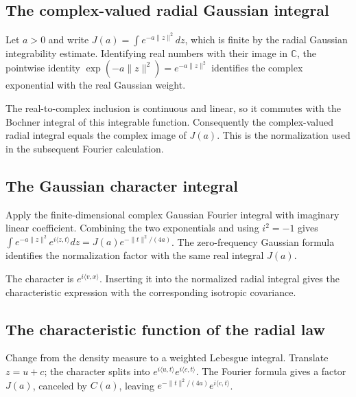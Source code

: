 \documentclass[11pt,a4paper]{report}
\begin{document}
\subsection{\texorpdfstring{The complex-valued radial Gaussian integral}{The complex-valued radial Gaussian integral}}
\label{report-step-UnadjustedLangevin-GaussianProposalDensity-lean-9}


Let \(a>0\) and write \(J(a)=\int e^{-a\|z\|^2}dz\), which is finite by the radial Gaussian integrability estimate. Identifying real numbers with their image in \(\mathbb C\), the pointwise identity \(\exp(-a\|z\|^2)=e^{-a\|z\|^2}\) identifies the complex exponential with the real Gaussian weight.



The real-to-complex inclusion is continuous and linear, so it commutes with the Bochner integral of this integrable function. Consequently the complex-valued radial integral equals the complex image of \(J(a)\). This is the normalization used in the subsequent Fourier calculation.

\subsection{\texorpdfstring{The Gaussian character integral}{The Gaussian character integral}}
\label{report-step-UnadjustedLangevin-GaussianProposalDensity-lean-10}


Apply the finite-dimensional complex Gaussian Fourier integral with imaginary linear coefficient. Combining the two exponentials and using \(i^2=-1\) gives \(\int e^{-a\|z\|^2}e^{i\langle z,t\rangle}dz=J(a)e^{-\|t\|^2/(4a)}\). The zero-frequency Gaussian formula identifies the normalization factor with the same real integral \(J(a)\).



The character is \(e^{i\langle v,x\rangle}\). Inserting it into the normalized radial integral gives the characteristic expression with the corresponding isotropic covariance.

\subsection{\texorpdfstring{The characteristic function of the radial law}{The characteristic function of the radial law}}
\label{report-step-UnadjustedLangevin-GaussianProposalDensity-lean-11}


Change from the density measure to a weighted Lebesgue integral. Translate \(z=u+c\); the character splits into \(e^{i\langle u,t\rangle}e^{i\langle c,t\rangle}\). The Fourier formula gives a factor \(J(a)\), canceled by \(C(a)\), leaving \(e^{-\|t\|^2/(4a)}e^{i\langle c,t\rangle}\).
\end{document}
